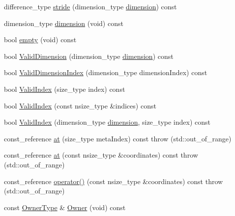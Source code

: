 \begin{DoxyCompactItemize}
difference\+\_\+type \hyperlink{classvct_dynamic_const_n_array_base_ace94a0354f11cf39dfc0d9836cd8122e}{stride} (dimension\+\_\+type \hyperlink{classvct_dynamic_const_n_array_base_aad976ad48dc9b1006d9e2729195f0b7c}{dimension}) const 
\item 
dimension\+\_\+type \hyperlink{classvct_dynamic_const_n_array_base_aad976ad48dc9b1006d9e2729195f0b7c}{dimension} (void) const 
\item 
bool \hyperlink{classvct_dynamic_const_n_array_base_ae2efdcfcdb01a9c89584ffa17a6d79e0}{empty} (void) const 
\item 
bool \hyperlink{classvct_dynamic_const_n_array_base_add7dd207dc8f6b17fcdb44a6a55f6ddb}{Valid\+Dimension} (dimension\+\_\+type \hyperlink{classvct_dynamic_const_n_array_base_aad976ad48dc9b1006d9e2729195f0b7c}{dimension}) const 
\item 
bool \hyperlink{classvct_dynamic_const_n_array_base_a5e268627a6d93defac33b610ae5207e9}{Valid\+Dimension\+Index} (dimension\+\_\+type dimension\+Index) const 
\item 
bool \hyperlink{classvct_dynamic_const_n_array_base_a45461c1a651ec96f94a7206c2ba6a595}{Valid\+Index} (size\+\_\+type index) const 
\item 
bool \hyperlink{classvct_dynamic_const_n_array_base_aec2f79e0e49b707f550ac6de3ec88b3e}{Valid\+Index} (const nsize\+\_\+type \&indices) const 
\item 
bool \hyperlink{classvct_dynamic_const_n_array_base_a6c8729dfaf1070eee13932cd03f95148}{Valid\+Index} (dimension\+\_\+type \hyperlink{classvct_dynamic_const_n_array_base_aad976ad48dc9b1006d9e2729195f0b7c}{dimension}, size\+\_\+type index) const 
\item 
const\+\_\+reference \hyperlink{classvct_dynamic_const_n_array_base_a50afd4908e7af348e03805ba0fa76ffe}{at} (size\+\_\+type meta\+Index) const   throw (std\+::out\+\_\+of\+\_\+range)
\item 
const\+\_\+reference \hyperlink{classvct_dynamic_const_n_array_base_aece110dd998e414779f0d85d9ac3854f}{at} (const nsize\+\_\+type \&coordinates) const   throw (std\+::out\+\_\+of\+\_\+range)
\item 
const\+\_\+reference \hyperlink{classvct_dynamic_const_n_array_base_ab68f2219e064e718aa5698438813c29b}{operator()} (const nsize\+\_\+type \&coordinates) const   throw (std\+::out\+\_\+of\+\_\+range)
\item 
const \hyperlink{classvct_dynamic_const_n_array_base_aad4328d01dc43be4b9047d594ed2ae8d}{Owner\+Type} \& \hyperlink{classvct_dynamic_const_n_array_base_acc00e30d65fefe68b280fb5912791a1f}{Owner} (void) const 

\end{DoxyCompactItemize}
